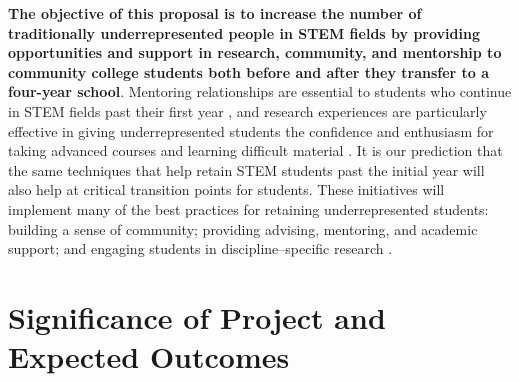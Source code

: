 \documentclass[12pt]{article}
\begin{document}

	
{\bf The objective of this proposal is to increase the number of traditionally underrepresented people in STEM fields by providing opportunities and support in research, community, and mentorship to community college students both before and after they transfer to a four-year school}. Mentoring relationships are essential to students who continue in STEM fields past their first year \citep{reureport,Nagda,Wilson}, and research experiences are particularly effective in giving underrepresented students the confidence and enthusiasm for taking advanced courses and learning difficult material \citep{armstrong03}. It is our prediction that the same techniques that help retain STEM students past the initial year will also help at critical transition points for students. These initiatives will implement many of the best practices for retaining underrepresented students:  building a sense of community; providing advising, mentoring, and academic support; and engaging students in discipline--specific research \citep{jordan,holland}. 	
\vspace{-5mm}

\section{\large{Significance of Project and Expected Outcomes}}
\vspace{-3mm}
\end{document}
